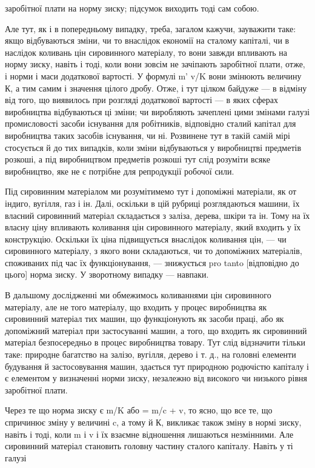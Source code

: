 \parcont{}  %
заробітної плати на норму зиску; підсумок виходить тоді сам
собою.

Але тут, як і в попередньому випадку, треба, загалом кажучи, зауважити таке: якщо відбуваються
зміни, чи то внаслідок економії на сталому капіталі, чи в наслідок коливань цін сировинного
матеріалу, то вони завжди впливають на норму
зиску, навіть і тоді, коли вони зовсім не зачіпають заробітної плати, отже, і норми і маси
додаткової вартості. У формулі m' v/K вони змінюють величину К, а тим самим і значення цілого дробу.
Отже, і тут цілком байдуже — в відміну від того, що виявилось при розгляді додаткової вартості — в
яких сферах виробництва відбуваються ці зміни; чи виробляють зачеплені цими змінами галузі
промисловості засоби існування для робітників,
відповідно сталий капітал для виробництва таких засобів існування, чи ні. Розвинене тут в такій
самій мірі стосується й до
тих випадків, коли зміни відбуваються у виробництві предметів
розкоші, а під виробництвом предметів розкоші тут слід розуміти всяке виробництво, яке не є потрібне
для репродукції робочої сили.

Під сировинним матеріалом ми розумітимемо тут і допоміжні
матеріали, як от індиго, вугілля, газ і ін. Далі, оскільки в цій
рубриці розглядаються машини, їх власний сировинний матеріал
складається з заліза, дерева, шкіри та ін. Тому на їх власну
ціну впливають коливання цін сировинного матеріалу, який входить у їх конструкцію. Оскільки їх ціна
підвищується внаслідок коливання цін, — чи сировинного матеріалу, з якого вони складаються, чи то
допоміжних матеріалів, споживаних під час
їх функціонування, — знижується pro tanto [відповідно до цього]
норма зиску. У зворотному випадку — навпаки.

В дальшому дослідженні ми обмежимось коливаннями цін сировинного матеріалу, але не того матеріалу,
що входить у процес виробництва як сировинний матеріал тих машин, що функціонують як засоби праці,
або як допоміжний матеріал при застосуванні машин, а того, що входить як сировинний матеріал
безпосередньо в процес виробництва товару. Тут слід відзначити тільки таке: природне багатство на
залізо, вугілля, дерево
і т. д., на головні елементи будування й застосовування машин,
здається тут природною родючістю капіталу і є елементом
у визначенні норми зиску, незалежно від високого чи низького
рівня заробітної плати.

Через те що норма зиску є m/K або = m/c + v, то ясно, що все те, що спричинює зміну у величині c, а
тому й К, викликає
також зміну в нормі зиску, навіть і тоді, коли m і v і їх взаємне
відношення лишаються незмінними. Але сировинний матеріал
становить головну частину сталого капіталу. Навіть у ті галузі
\parbreak{}  %
